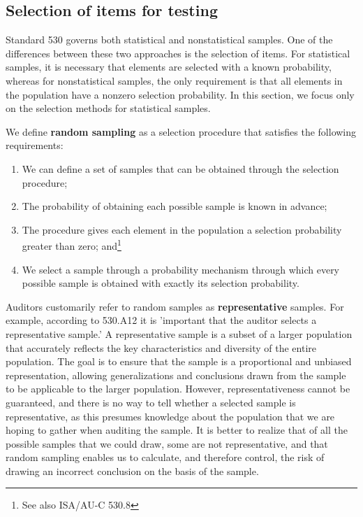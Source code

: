
\subsection{Selection of items for testing} %
\label{sub:selection_of_items_for_testing}

Standard 530 governs both statistical and nonstatistical samples. One of the differences between these two approaches is the selection of items. For statistical samples, it is necessary that elements are selected with a known probability, whereas for nonstatistical samples, the only requirement is that all elements in the population have a nonzero selection probability. In this section, we focus only on the selection methods for statistical samples. 

\bigskip
We define \textbf{random sampling} as a selection procedure that satisfies the following requirements:

\begin{enumerate}
\item We can define a set of samples that can be obtained through the selection procedure;
\item The probability of obtaining each possible sample is known in advance;
\item The procedure gives each element in the population a selection probability greater than zero; and\footnote{See also ISA/AU-C 530.8}
\item We select a sample through a probability mechanism through which every possible sample is obtained with exactly its selection probability.
\end{enumerate}

Auditors customarily refer to random samples as \textbf{representative} samples. For example, according to 530.A12 it is 'important that the auditor selects a representative sample.' A representative sample is a subset of a larger population that accurately reflects the key characteristics and diversity of the entire population. The goal is to ensure that the sample is a proportional and unbiased representation, allowing generalizations and conclusions drawn from the sample to be applicable to the larger population. However, representativeness cannot be guaranteed, and there is no way to tell whether a selected sample is representative, as this presumes knowledge about the population that we are hoping to gather when auditing the sample. It is better to realize that of all the possible samples that we could draw, some are not representative, and that random sampling enables us to calculate, and therefore control, the risk of drawing an incorrect conclusion on the basis of the sample. 

